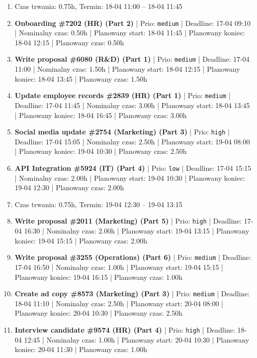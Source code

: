 {\begin{enumerate}
  \item [\textbf{PRZERWA}] Czas trwania: 0.75h, Termin: 18-04 11:00 -- 18-04 11:45
  \item [\textbf{14648}] \textbf{Onboarding \#7202 (HR) (Part 2)} | Prio: \texttt{medium} | Deadline: 17-04 09:10 | Nominalny czas: 0.50h | Planowany start: 18-04 11:45 | Planowany koniec: 18-04 12:15 | Planowany czas: 0.50h
  \item [\textbf{14669}] \textbf{Write proposal \#6080 (R\&D) (Part 1)} | Prio: \texttt{medium} | Deadline: 17-04 11:00 | Nominalny czas: 1.50h | Planowany start: 18-04 12:15 | Planowany koniec: 18-04 13:45 | Planowany czas: 1.50h
  \item [\textbf{14670}] \textbf{Update employee records \#2839 (HR) (Part 1)} | Prio: \texttt{medium} | Deadline: 17-04 11:45 | Nominalny czas: 3.00h | Planowany start: 18-04 13:45 | Planowany koniec: 18-04 16:45 | Planowany czas: 3.00h
  \item [\textbf{14611}] \textbf{Social media update \#2754 (Marketing) (Part 3)} | Prio: \texttt{high} | Deadline: 17-04 15:05 | Nominalny czas: 2.50h | Planowany start: 19-04 08:00 | Planowany koniec: 19-04 10:30 | Planowany czas: 2.50h
  \item [\textbf{14696}] \textbf{API Integration \#5924 (IT) (Part 4)} | Prio: \texttt{low} | Deadline: 17-04 15:15 | Nominalny czas: 2.00h | Planowany start: 19-04 10:30 | Planowany koniec: 19-04 12:30 | Planowany czas: 2.00h
  \item [\textbf{PRZERWA}] Czas trwania: 0.75h, Termin: 19-04 12:30 -- 19-04 13:15
  \item [\textbf{14628}] \textbf{Write proposal \#2011 (Marketing) (Part 5)} | Prio: \texttt{high} | Deadline: 17-04 16:30 | Nominalny czas: 2.00h | Planowany start: 19-04 13:15 | Planowany koniec: 19-04 15:15 | Planowany czas: 2.00h
  \item [\textbf{14654}] \textbf{Write proposal \#3255 (Operations) (Part 6)} | Prio: \texttt{medium} | Deadline: 17-04 16:50 | Nominalny czas: 1.00h | Planowany start: 19-04 15:15 | Planowany koniec: 19-04 16:15 | Planowany czas: 1.00h
  \item [\textbf{14677}] \textbf{Create ad copy \#8573 (Marketing) (Part 3)} | Prio: \texttt{medium} | Deadline: 18-04 11:10 | Nominalny czas: 2.50h | Planowany start: 20-04 08:00 | Planowany koniec: 20-04 10:30 | Planowany czas: 2.50h
  \item [\textbf{14612}] \textbf{Interview candidate \#9574 (HR) (Part 4)} | Prio: \texttt{high} | Deadline: 18-04 12:45 | Nominalny czas: 1.00h | Planowany start: 20-04 10:30 | Planowany koniec: 20-04 11:30 | Planowany czas: 1.00h

\end{enumerate}}
